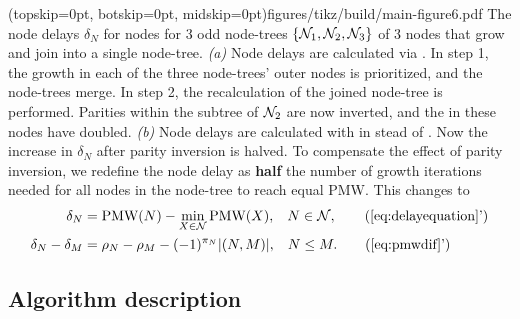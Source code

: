\Figure[hbt!](topskip=0pt, botskip=0pt, midskip=0pt){figures/tikz/build/main-figure6.pdf}{
    The node delays $\delta_N$ for nodes for 3 odd node-trees $\{\mathcal{N}_1, \mathcal{N}_2, \mathcal{N}_3\}$ of 3 nodes that grow and join into a single node-tree. \emph{(a)} Node delays are calculated via . In step 1, the growth in each of the three node-trees' outer nodes is prioritized, and the node-trees merge. In step 2, the recalculation of the joined node-tree is performed. Parities within the subtree of $\mathcal{N}_2$ are now inverted, and the  in these nodes have doubled. \emph{(b)} Node delays are calculated with  in stead of . Now the increase in $\delta_N$ after parity inversion is halved.\label{fig:partialdfs}}
To compensate the effect of parity inversion, we redefine the node delay as \textbf{half} the number of growth iterations needed for all nodes in the node-tree to reach equal PMW. This changes  to 
\begin{align}
    \delta_N &= \text{PMW}(N) - \min_{X\in\nset}{\text{PMW}(X)}, \hspace{.3cm} N \in \nset, \tag{\ref{eq:delayequation}'}  \\
    \delta_N - \delta_M &= \rho_N-\rho_M - (-1)^{\pi_N}\abs{(N,M)}, \hspace{.3cm} N\leq M. \tag{\ref{eq:pmwdif}'}\label{eq:pmwdifnew}
\end{align}

\subsection{Algorithm description}\label{sec:pseudocode}

